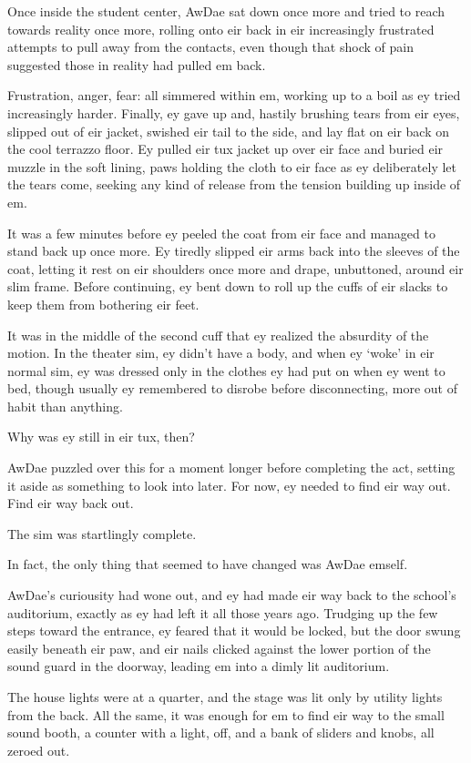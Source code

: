 Once inside the student center, AwDae sat down once more and tried to reach towards reality once more, rolling onto eir back in eir increasingly frustrated attempts to pull away from the contacts, even though that shock of pain suggested those in reality had pulled em back.

Frustration, anger, fear: all simmered within em, working up to a boil as ey tried increasingly harder. Finally, ey gave up and, hastily brushing tears from eir eyes, slipped out of eir jacket, swished eir tail to the side, and lay flat on eir back on the cool terrazzo floor. Ey pulled eir tux jacket up over eir face and buried eir muzzle in the soft lining, paws holding the cloth to eir face as ey deliberately let the tears come, seeking any kind of release from the tension building up inside of em.

It was a few minutes before ey peeled the coat from eir face and managed to stand back up once more. Ey tiredly slipped eir arms back into the sleeves of the coat, letting it rest on eir shoulders once more and drape, unbuttoned, around eir slim frame. Before continuing, ey bent down to roll up the cuffs of eir slacks to keep them from bothering eir feet.

It was in the middle of the second cuff that ey realized the absurdity of the motion. In the theater sim, ey didn't have a body, and when ey `woke' in eir normal sim, ey was dressed only in the clothes ey had put on when ey went to bed, though usually ey remembered to disrobe before disconnecting, more out of habit than anything.

Why was ey still in eir tux, then?

AwDae puzzled over this for a moment longer before completing the act, setting it aside as something to look into later. For now, ey needed to find eir way out. Find eir way back out.

\secdiv

The sim was startlingly complete.

In fact, the only thing that seemed to have changed was AwDae emself.

AwDae's curiousity had wone out, and ey had made eir way back to the school's auditorium, exactly as ey had left it all those years ago. Trudging up the few steps toward the entrance, ey feared that it would be locked, but the door swung easily beneath eir paw, and eir nails clicked against the lower portion of the sound guard in the doorway, leading em into a dimly lit auditorium.

The house lights were at a quarter, and the stage was lit only by utility lights from the back. All the same, it was enough for em to find eir way to the small sound booth, a counter with a light, off, and a bank of sliders and knobs, all zeroed out.

